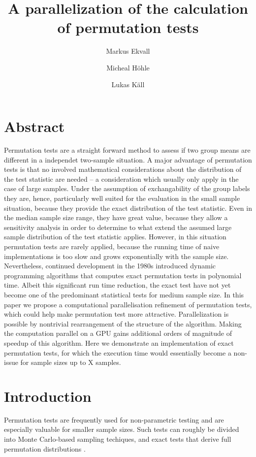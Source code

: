 \documentclass[a4paper,11pt]{article}
\title{A parallelization of the calculation of permutation tests}
\author[1]{Markus Ekvall}
\author[2]{Micheal Höhle}
\author[1]{Lukas Käll}
\affil[1]{Science for Life Laboratory, School of Engineering Sciences in Chemistry, Biotechnology and Health,
 KTH -- Royal Institute of Technology, Box 1031, 17121 Solna, Sweden}
\affil[2]{Department of Mathematics, Stocholm University,
  106 91 Stockholm, Sweden}
\begin{document}
\maketitle

\section{Abstract}

Permutation tests are a straight forward method to assess if two group means are different in a independet two-sample situation. A major advantage of permutation tests is that no involved mathematical considerations about the distribution of the test statistic are needed -- a consideration which usually only apply in the case of large samples. Under the assumption of exchangability of the group labels they are, hence, particularly well suited for the evaluation in the small sample situation, because they provide the exact distribution of the test statistic. Even in the median sample size range, they have great value, because they allow a sensitivity analysis in order to determine to what extend the assumed large sample distribution of the test statistic applies. However, in this situation permutation tests are rarely applied, because the running time of naive implementations is too slow and grows exponentially with the sample size. Nevertheless, continued development in the 1980s introduced dynamic programming algorithms that computes exact permutation tests in polynomial time. Albeit this significant run time reduction, the exact test have not yet become one of the predominant statistical tests for medium sample size. In this paper we propose a computational parallelisation refinement of permutation tests, which could  help make permutation test more attractive. Parallelization is possible by nontrivial rearrangement of the structure of the algorithm. Making the computation parallel on a GPU gains additional orders of magnitude of speedup of this algorithm. Here we demonstrate an implementation of exact permutation tests, for which the execution time would essentially become a non-issue for sample sizes up to X samples. 

\section{Introduction}
Permutation tests are frequently used for non-parametric testing and are especially valuable for smaller sample sizes. Such tests can roughly be divided into Monte Carlo-based sampling techiques\cite{segal2018fast}, and exact tests that derive full permutation distributions .
\end{document}
